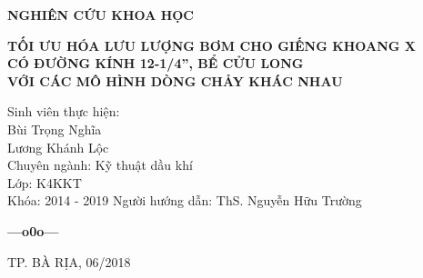\documentclass[12pt,a4paper]{article}
\begin{document}
\begin{titlepage}
\textbf{\LARGE NGHIÊN CỨU KHOA HỌC}\\[0.8cm]

\begin{center}
\centering
{ \bfseries TỐI ƯU HÓA LƯU LƯỢNG BƠM CHO GIẾNG KHOANG X\\
CÓ ĐƯỜNG KÍNH 12-1/4'', BỂ CỬU LONG\\
VỚI CÁC MÔ HÌNH DÒNG CHẢY KHÁC NHAU\\[2.0cm]}
\end{center}

\begin{flushleft}
\tab[7cm]Sinh viên thực hiện:\\
\tab[9cm]Bùi Trọng Nghĩa\\
\tab[9cm]Lương Khánh Lộc\\
\tab[7cm]Chuyên ngành: Kỹ thuật dầu khí\\
\tab[7cm]Lớp: K4KKT\\
\tab[7cm]Khóa: 2014 - 2019
\tab[7cm]Người hướng dẫn: ThS. Nguyễn Hữu Trường\\[1.0cm]
\end{flushleft}
\begin{center}
    \centering
    \textbf{---o0o---}
\end{center}



\vfill
{\normalsize TP. BÀ RỊA, 06/2018}

\end{titlepage}
\end{document}
